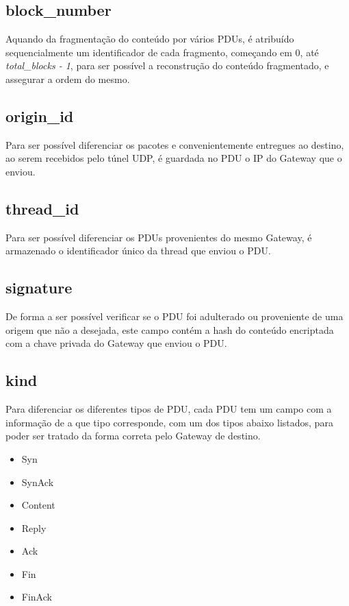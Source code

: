 \documentclass[a4paper]{report}
\begin{document}
\subsection{block\_number}

Aquando da fragmentação do conteúdo por vários PDUs, é atribuído sequencialmente
um identificador de cada fragmento, começando em 0, até \textit{total\_blocks
- 1}, para ser possível a reconstrução do conteúdo fragmentado, e assegurar
a ordem do mesmo.

\subsection{origin\_id}

Para ser possível diferenciar os pacotes e convenientemente entregues ao 
destino, ao serem recebidos pelo túnel UDP, é guardada no PDU o IP do 
Gateway que o enviou.

\subsection{thread\_id}

Para ser possível diferenciar os PDUs provenientes do mesmo Gateway,
é armazenado o identificador único da thread que enviou o PDU.

\subsection{signature}

De forma a ser possível verificar se o PDU foi adulterado ou proveniente
de uma origem que não a desejada, este campo contém a hash do conteúdo
encriptada com a chave privada do Gateway que enviou o PDU.

\subsection{kind} \label{subs:kind}

Para diferenciar os diferentes tipos de PDU, cada PDU tem um campo
com a informação de a que tipo corresponde, com um dos tipos abaixo
listados, para poder ser tratado da forma correta pelo Gateway de 
destino.
\begin{itemize}
        \item Syn
        \item SynAck
        \item Content
        \item Reply
        \item Ack
        \item Fin
        \item FinAck
\end{itemize}
\end{document}
